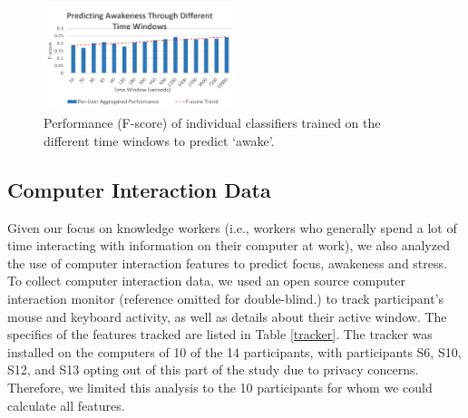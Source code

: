 \begin{figure}
  \centering
      \includegraphics[width=0.5\textwidth]{20180912AwakenessTWBars.png}
  \caption{Performance (F-score) of individual classifiers trained on the different time windows to predict `awake'.}
  \label{timeWindowsPandR}
\end{figure}




\subsection{Computer Interaction Data} \label{secCI}
Given our focus on knowledge workers (i.e., workers who generally spend a lot of time interacting with information on their computer at work), we also analyzed the use of computer interaction features to predict focus, awakeness and stress. To collect computer interaction data, we used an open source computer interaction monitor (reference omitted for double-blind.)
to track participant's mouse and keyboard activity, as well as details about their active window. The specifics of the features tracked are listed in Table \ref{tracker}. The tracker was installed on the computers of 10 of the 14 participants, with participants S6, S10, S12, and S13 opting out of this part of the study due to privacy concerns.  Therefore, we limited this analysis to the 10 participants for whom we could calculate all features. 

